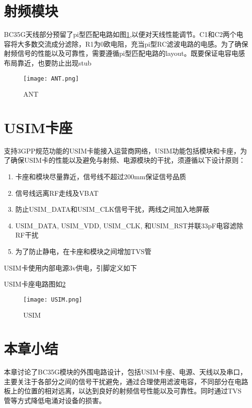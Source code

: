\section{射频模块}
BC35G天线部分预留了pi型匹配电路如图\ref{ANT},以便对天线性能调节。C1和C2两个电容将大多数交流成分滤除，R1为0欧电阻，充当pi型RC滤波电路的电感。为了确保射频信号的性能以及可靠性，需要遵循pi型匹配电路的layout。既要保证电容电感布局靠近，也要防止出现stub\cite{OKgagaga,stubeffect}
\begin{figure}[H]
	\centering
	\texttt{[image: ANT.png]}
	\caption{ANT}
	\label{ANT}
\end{figure}
\section{USIM卡座}
支持3GPP规范功能的USIM卡能接入运营商网络，USIM功能包括模块和卡座，为了确保USIM卡的性能以及避免与射频、电源模块的干扰，须遵循以下设计原则：

\begin{enumerate}
\item 卡座和模块尽量靠近，信号线不超过200mm保证信号品质
\item 信号线远离RF走线及VBAT
\item 防止USIM\_DATA和USIM\_CLK信号干扰，两线之间加入地屏蔽
\item USIM\_DATA, USIM\_VDD, USIM\_CLK, 和USIM\_RST并联33pF电容滤除RF干扰
\item 为了防止静电，在卡座和模块之间增加TVS管
\end{enumerate}

USIM卡使用内部电源3v供电，引脚定义如下

USIM卡座电路图如\ref{USIM}
\begin{figure}[H]
	\centering
	\texttt{[image: USIM.png]}
	\caption{USIM}
	\label{USIM}
\end{figure}

\section{本章小结}

本章讨论了BC35G模块的外围电路设计，包括USIM卡座、电源、天线以及串口，主要关注于各部分之间的信号干扰避免，通过合理使用滤波电容，不同部分在电路板上的位置的相对远离，以达到良好的射频信号性能以及可靠性。同时通过TVS管等方式降低电涌对设备的损害。